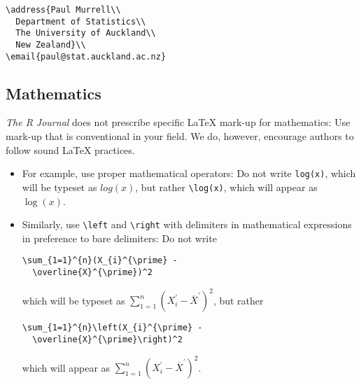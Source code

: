 \begin{verbatim}
\address{Paul Murrell\\
  Department of Statistics\\
  The University of Auckland\\
  New Zealand}\\
\email{paul@stat.auckland.ac.nz}
\end{verbatim}

\subsection{Mathematics}

\emph{The R Journal} does not prescribe specific \LaTeX{} mark-up for mathematics: Use
mark-up that is conventional in your field. We do, however, encourage authors to
follow sound \LaTeX{} practices. 

\begin{itemize}

\item For example, use proper mathematical operators: 
Do not write \verb|log(x)|, which will be typeset as $log(x)$, but rather \verb|\log(x)|,
which will appear as $\log(x)$. 

\item Similarly, use \verb|\left| and \verb|\right| with
delimiters in mathematical expressions in preference to bare delimiters:
Do not write

\begin{verbatim}
\sum_{1=1}^{n}(X_{i}^{\prime} - 
  \overline{X}^{\prime})^2
\end{verbatim}

which will be typeset as $\sum_{1=1}^{n}(X_{i}^{\prime} - \overline{X}^{\prime})^2$,
but rather

\begin{verbatim}
\sum_{1=1}^{n}\left(X_{i}^{\prime} - 
  \overline{X}^{\prime}\right)^2
\end{verbatim}

which will appear as $\sum_{1=1}^{n}\left(X_{i}^{\prime} - \overline{X}^{\prime}\right)^2$.

\end{itemize}

